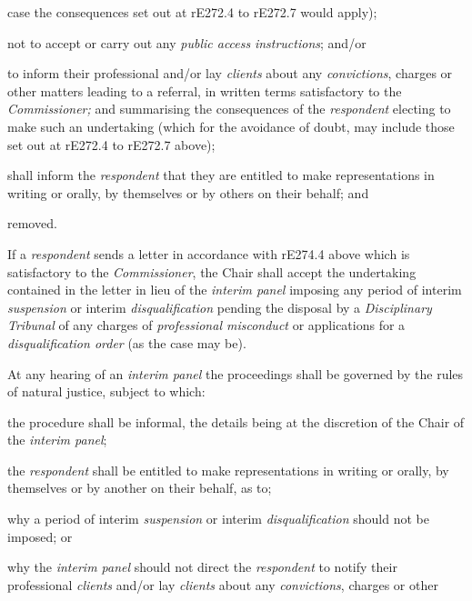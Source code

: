 case the consequences set out at rE272.4 to rE272.7 would apply);\\
\item not to accept or carry out any \emph{public
access} \emph{instructions}; and/or\\
\item to inform their professional and/or lay \emph{clients} about
any \emph{convictions}, charges or other matters leading to a referral,
in written terms satisfactory to the \emph{Commissioner;}\la
and summarising the consequences of the \emph{respondent} electing to
make such an undertaking (which for the avoidance of doubt, may include
those set out at rE272.4 to rE272.7 above);\item shall inform the \emph{respondent} that they are entitled to make
representations in writing or orally, by themselves or by others on
their behalf; and\item removed.\ln
{}\par
If a \emph{respondent} sends a letter in accordance with rE274.4 above
which is satisfactory to the \emph{Commissioner}, the Chair shall accept
the undertaking contained in the letter in lieu of the \emph{interim
panel }imposing any period of interim \emph{suspension} or
interim \emph{disqualification} pending the disposal by
a \emph{Disciplinary Tribunal} of any charges of \emph{professional
misconduct} or applications for a \emph{disqualification order} (as the
case may be).\\
\par
{}
At any hearing of an \emph{interim panel} the proceedings shall be
governed by the rules of natural justice, subject to which:\\\nl \item the procedure shall be informal, the details being at the discretion
of the Chair of the \emph{interim panel};\item the \emph{respondent} shall be entitled to make representations in
writing or orally, by themselves or by another on their behalf, as to;\al
\item why a period of interim \emph{suspension} or
interim \emph{disqualification} should not be imposed; or\\
\item  why the \emph{interim panel} should not direct
the \emph{respondent} to notify their professional \emph{clients} and/or
lay \emph{clients} about any \emph{convictions}, charges or other
